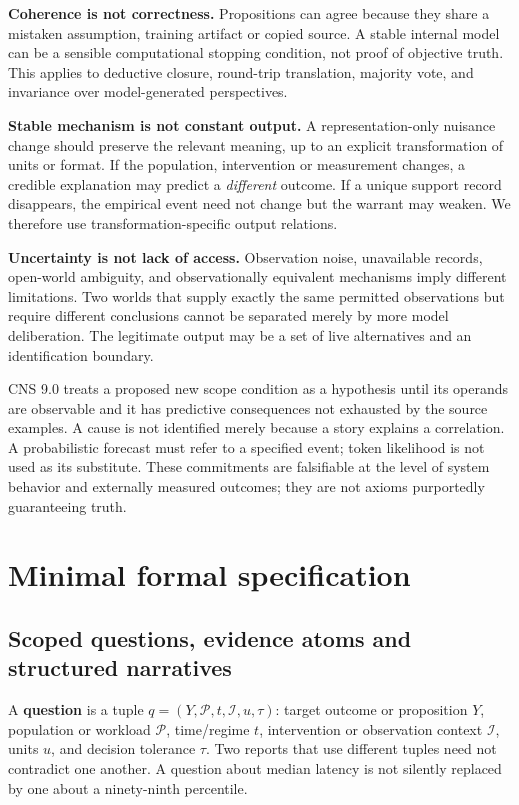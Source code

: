 \documentclass[11pt,a4paper]{article}
\begin{document}
\textbf{Coherence is not correctness.} Propositions can agree because
they share a mistaken assumption, training artifact or copied source. A
stable internal model can be a sensible computational stopping
condition, not proof of objective truth. This applies to deductive
closure, round-trip translation, majority vote, and invariance over
model-generated perspectives.

\textbf{Stable mechanism is not constant output.} A representation-only
nuisance change should preserve the relevant meaning, up to an explicit
transformation of units or format. If the population, intervention or
measurement changes, a credible explanation may predict a
\emph{different} outcome. If a unique support record disappears, the
empirical event need not change but the warrant may weaken. We therefore
use transformation-specific output relations.

\textbf{Uncertainty is not lack of access.} Observation noise,
unavailable records, open-world ambiguity, and observationally
equivalent mechanisms imply different limitations. Two worlds that
supply exactly the same permitted observations but require different
conclusions cannot be separated merely by more model deliberation. The
legitimate output may be a set of live alternatives and an
identification boundary.

CNS 9.0 treats a proposed new scope condition as a hypothesis until its
operands are observable and it has predictive consequences not exhausted
by the source examples. A cause is not identified merely because a story
explains a correlation. A probabilistic forecast must refer to a
specified event; token likelihood is not used as its substitute. These
commitments are falsifiable at the level of system behavior and
externally measured outcomes; they are not axioms purportedly
guaranteeing truth.

\section{Minimal formal
specification}\label{minimal-formal-specification}

\subsection{Scoped questions, evidence atoms and structured
narratives}\label{scoped-questions-evidence-atoms-and-structured-narratives}

A \textbf{question} is a tuple
\(q=(Y,\mathcal{P},t,\mathcal{I},u,\tau)\): target outcome or
proposition \(Y\), population or workload \(\mathcal{P}\), time/regime
\(t\), intervention or observation context \(\mathcal{I}\), units \(u\),
and decision tolerance \(\tau\). Two reports that use different tuples
need not contradict one another. A question about median latency is not
silently replaced by one about a ninety-ninth percentile.
\end{document}
